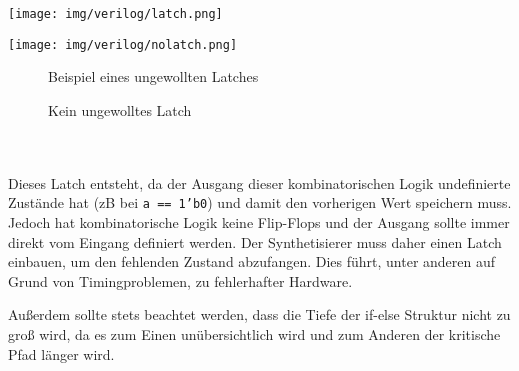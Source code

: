 \begin{minipage}[H]{\textwidth}
	\begin{minipage}[b]{0.5\textwidth}
		\texttt{[image: img/verilog/latch.png]}
	\end{minipage}
	\begin{minipage}[b]{0.5\textwidth}
		\texttt{[image: img/verilog/nolatch.png]}
	\end{minipage}
\end{minipage}
\begin{minipage}[H]{\textwidth}
	\begin{minipage}[b]{0.5\textwidth}
		\centering
		\begin{minipage}[b]{0.9\textwidth}
			\begin{figure}[H]
				\lstset{style=verilog-style}
				
				\caption{Beispiel eines ungewollten Latches} \label{bspinfif}
			\end{figure}
		\end{minipage}
	\end{minipage}	
	\begin{minipage}[b]{0.5\textwidth}
		\centering
		\begin{minipage}[b]{0.9\textwidth}
			\begin{figure}[H]
				\lstset{style=verilog-style}
				
				\caption{Kein ungewolltes Latch} \label{bspnoinfif}
			\end{figure}
		\end{minipage}
	\end{minipage}	
\end{minipage}
\\\\

Dieses Latch entsteht, da der Ausgang dieser kombinatorischen Logik undefinierte Zustände hat (zB bei \texttt{a == 1'b0}) und damit den vorherigen Wert speichern muss. Jedoch hat kombinatorische Logik keine Flip-Flops und der Ausgang sollte immer direkt vom Eingang definiert werden. Der Synthetisierer muss daher einen Latch einbauen, um den fehlenden Zustand abzufangen. Dies führt, unter anderen auf Grund von Timingproblemen, zu fehlerhafter Hardware.

Außerdem sollte stets beachtet werden, dass die Tiefe der if-else Struktur nicht zu groß wird, da es zum Einen unübersichtlich wird und zum Anderen der kritische Pfad länger wird.

